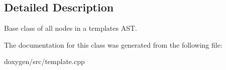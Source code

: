 \subsection{Detailed Description}
Base class of all nodes in a template\textquotesingle{}s A\+ST. 

The documentation for this class was generated from the following file\+:\begin{DoxyCompactItemize}
\item 
doxygen/src/template.\+cpp\end{DoxyCompactItemize}
